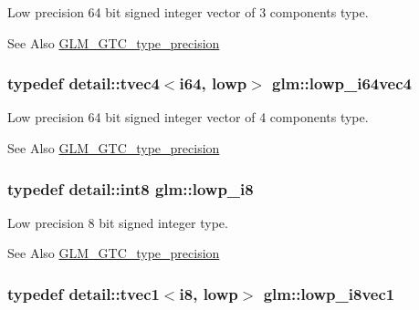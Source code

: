 Low precision 64 bit signed integer vector of 3 components type. \begin{DoxySeeAlso}{See Also}
\hyperlink{group__gtc__type__precision}{G\-L\-M\-\_\-\-G\-T\-C\-\_\-type\-\_\-precision} 
\end{DoxySeeAlso}
\hypertarget{group__gtc__type__precision_ga95c13b9d4f94d1783e7d96534d1651d8}{
\subsubsection[{lowp\-\_\-i64vec4}]{\setlength{\rightskip}{0pt plus 5cm}typedef detail\-::tvec4$<$i64, lowp$>$ {\bf glm\-::lowp\-\_\-i64vec4}}}\label{group__gtc__type__precision_ga95c13b9d4f94d1783e7d96534d1651d8}
Low precision 64 bit signed integer vector of 4 components type. \begin{DoxySeeAlso}{See Also}
\hyperlink{group__gtc__type__precision}{G\-L\-M\-\_\-\-G\-T\-C\-\_\-type\-\_\-precision} 
\end{DoxySeeAlso}
\hypertarget{group__gtc__type__precision_gaa2e13ee29c90f75658beed6082541097}{
\subsubsection[{lowp\-\_\-i8}]{\setlength{\rightskip}{0pt plus 5cm}typedef detail\-::int8 {\bf glm\-::lowp\-\_\-i8}}}\label{group__gtc__type__precision_gaa2e13ee29c90f75658beed6082541097}
Low precision 8 bit signed integer type. \begin{DoxySeeAlso}{See Also}
\hyperlink{group__gtc__type__precision}{G\-L\-M\-\_\-\-G\-T\-C\-\_\-type\-\_\-precision} 
\end{DoxySeeAlso}
\hypertarget{group__gtc__type__precision_ga490ff77964d0386c1db936eb2a324988}{
\subsubsection[{lowp\-\_\-i8vec1}]{\setlength{\rightskip}{0pt plus 5cm}typedef detail\-::tvec1$<$i8, lowp$>$ {\bf glm\-::lowp\-\_\-i8vec1}}}\label{group__gtc__type__precision_ga490ff77964d0386c1db936eb2a324988}
